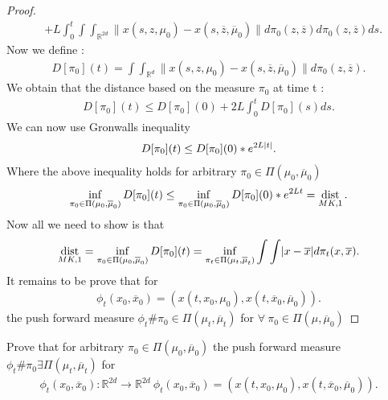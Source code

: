 \begin{proof}
\begin{align*}
                                                                                                                               &+   L \int_0^{t} \int \int_{\mathbb{R}^{2d} }  \|x(s,z,\mu_0) - x(s,\overline{z},\overline{\mu }_0  )\| d\pi_0(z,\overline{z} ) d\pi_0(z,\overline{z}) ds
 .\end{align*}
 Now we define : 
 \begin{align*}
   D[\pi_0](t) = \int \int_{\mathbb{R}^{d} } \|x(s,z,\mu_0) - x(s,\overline{z},\overline{\mu }_0  )\| d\pi_0(z,\overline{z} )
 .\end{align*}
 We obtain that the distance based on the measure $\pi_0$ at time t :
 \begin{align*}
   D[\pi_0](t) \le  D[\pi_{0}](0) + 2L \int_0^{t} D[\pi_0](s) ds
 .\end{align*}
 We can now use  Gronwalls inequality 
 \begin{align*}
   D[\pi_0](t) \le D[\pi_0](0)*e^{2L\lvert t\rvert}
 .\end{align*}
 Where the above inequality holds for arbitrary $ \pi_0 \in  \Pi(\mu_{0},\overline{\mu }_0 )$
 \begin{align*}
   \inf_{\pi_0 \in  \Pi(\mu_0,\overline{\mu }_0 )} D[\pi_0](t) \le \inf_{\pi_0 \in  \Pi (\mu_0,\overline{\mu }_0 )} D[\pi_0](0)*e^{2Lt}  = \operatorname*{dist}_{MK,1}
 .\end{align*}
 Now all we need to show is that 
 \begin{align*}
   \operatorname*{dist}_{MK,1} = \inf_{\pi_0 \in  \Pi(\mu_0,\overline{\mu }_0 )} D[\pi_0](t)  = \inf_{\pi_t \in  \Pi(\mu_t,\overline{\mu }_t )} \int \int \lvert x-\overline{x} \rvert d\pi_t(x,\overline{x} )
 .\end{align*}
 It remains to be prove that for
 \begin{align*}
  \phi_t(x_{0},\overline{x}_0 ) = (x(t,x_{0},\mu_{0}),x(t,\overline{x}_0,\overline{\mu }_0  ))
 .\end{align*}
 the push forward measure $\phi_t \# \pi_0 \in  \Pi(\mu_t,\overline{\mu }_t )$ for $\forall  \ \pi_0 \in  \Pi(\mu ,\overline{\mu }_0 )$
\end{proof}
\begin{exercise}
  Prove that for arbitrary $\pi_0 \in  \Pi(\mu_0,\overline{\mu }_0 )$  the push forward measure $\phi_t \# \pi_0 \exists  \Pi(\mu_t,\overline{\mu }_t )$ for 
  \begin{align*}
    \phi_t(x_{0},\overline{x}_0 ) : \mathbb{R}^{2d} \to  \mathbb{R}^{2d} \ \phi_t(x_{0},\overline{x}_0 )   = (x(t,x_{0},\mu_0),x(t,\overline{x}_{0},\overline{\mu}_0))
  .\end{align*}
\end{exercise}

